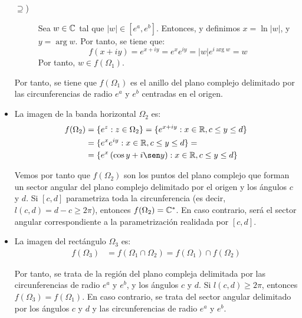 \begin{ejercicio}
\begin{itemize}
\begin{description}
            \item[$\supseteq$)] Sea $w\in \mathbb{C}$ tal que $|w|\in [e^a,e^b]$. Entonces, y definimos $x=\ln |w|$, y $y = \arg w$. Por tanto, se tiene que:
            \begin{equation*}
                f(x+iy) = e^{x+iy} = e^x e^{iy} = |w|e^{i\arg w} = w
            \end{equation*}
            Por tanto, $w\in f(\Omega_1)$.
        \end{description}

        Por tanto, se tiene que $f(\Omega_1)$ es el anillo del plano complejo delimitado por las circunferencias de radio $e^a$ y $e^b$ centradas en el origen.

        \item La imagen de la banda horizontal $\Omega_2$ es:
        \begin{align*}
            f(\Omega_2) &= \{e^z : z\in \Omega_2\} = \{e^{x+iy} : x\in \bb{R}, c\leq y\leq d\} \\
            &= \{e^x e^{iy} : x\in \bb{R}, c\leq y\leq d\}
            =\\&= \{e^x\left(\cos y + i\sen y\right) : x\in \bb{R}, c\leq y\leq d\}
        \end{align*}

        Vemos por tanto que $f(\Omega_2)$ son los puntos del plano complejo que forman un sector angular del plano complejo delimitado por el origen y los ángulos $c$ y $d$. Si $[c,d]$ parametriza toda la circunferencia (es decir, $l(c,d)=d-c\geq 2\pi$), entonces $f(\Omega_2)=\mathbb{C}^*$. En caso contrario, será el sector angular correspondiente a la parametrización realidada por $[c,d]$.

        \item La imagen del rectángulo $\Omega_3$ es:
        \begin{align*}
            f(\Omega_3) &= f(\Omega_1\cap \Omega_2) = f(\Omega_1)\cap f(\Omega_2)
        \end{align*}

        Por tanto, se trata de la región del plano compleja delimitada por las circunferencias de radio $e^a$ y $e^b$, y los ángulos $c$ y $d$. Si $l(c,d)\geq 2\pi$, entonces $f(\Omega_3) = f(\Omega_1)$. En caso contrario, se trata del sector angular delimitado por los ángulos $c$ y $d$ y las circunferencias de radio $e^a$ y $e^b$.
    \end{itemize}
\end{ejercicio}

